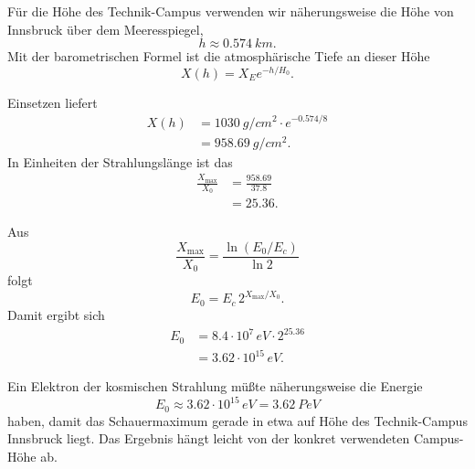 \documentclass[11pt,a4paper]{scrartcl}
\begin{document}
\begin{enumerate}[label=(\alph*)]
            \begin{calculationbox}
                Für die Höhe des Technik-Campus verwenden wir näherungsweise die Höhe von
                Innsbruck über dem Meeresspiegel,
                \[
                    h\approx\SI{0.574}{km}.
                \]
                Mit der barometrischen Formel ist die atmosphärische Tiefe an dieser Höhe
                \[
                    X(h)=X_Ee^{-h/H_0}.
                \]

                \begin{calculationbox}
                    Einsetzen liefert
                    \begin{align*}
                        X(h)&=\SI{1030}{g/cm^2}\cdot e^{-0.574/8}\\
                        &=\SI{958.69}{g/cm^2}.
                    \end{align*}
                    In Einheiten der Strahlungslänge ist das
                    \begin{align*}
                        \frac{X_{\max}}{X_0}
                        &=\frac{958.69}{37.8}\\
                        &=25.36.
                    \end{align*}
                \end{calculationbox}

                \begin{calculationbox}
                    Aus
                    \[
                        \frac{X_{\max}}{X_0}=\frac{\ln(E_0/E_c)}{\ln2}
                    \]
                    folgt
                    \[
                        E_0=E_c\,2^{X_{\max}/X_0}.
                    \]
                    Damit ergibt sich
                    \begin{align*}
                        E_0
                        &=8.4\cdot10^7\,\si{eV}\cdot 2^{25.36}\\
                        &=3.62\cdot10^{15}\,\si{eV}.
                    \end{align*}
                \end{calculationbox}
            \end{calculationbox}

            \begin{answerbox}
                Ein Elektron der kosmischen Strahlung müßte näherungsweise die Energie
                \[
                    \boxed{E_0\approx 3.62\cdot 10^{15}\,\si{eV}=\SI{3.62}{PeV}}
                \]
                haben, damit das Schauermaximum gerade in etwa auf Höhe des Technik-Campus
                Innsbruck liegt. Das Ergebnis hängt leicht von der konkret verwendeten
                Campus-Höhe ab.
            \end{answerbox}
    \end{enumerate}
\end{document}
